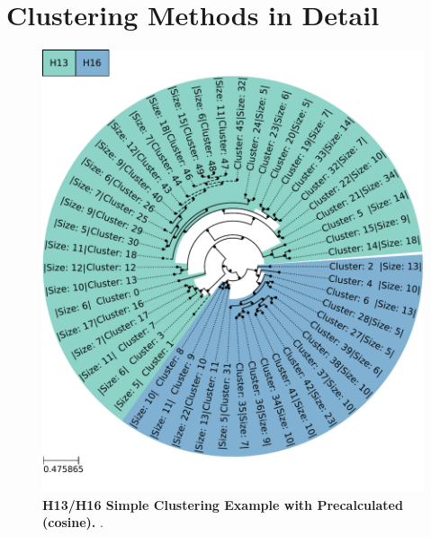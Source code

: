 \section{Clustering Methods in Detail} \label{sec:Comparison_Clustering}

\begin{figure}[!hbt]
    \centering
    \includegraphics[width=\textwidth]{PCA/Clustertree_Segment_4_H_Cosine.pdf}
    \caption[H13/H16 Simple Clustering Example with Precalculated (cosine)]{\textbf{H13/H16 Simple Clustering Example with Precalculated (cosine).} .}
    \label{fig:Simple_Clustertree_Cosine}
\end{figure}

